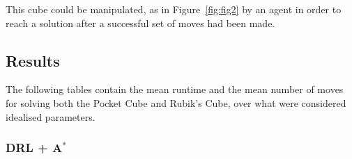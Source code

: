 \documentclass[UKenglish]{libraries/svproc}
\begin{document}
This cube could be manipulated, as in Figure~\ref{fig:fig2} by an agent in order to reach a solution after a successful set of moves had been made.

\subsection{Results}

The following tables contain the mean runtime and the mean number of moves for solving both the Pocket Cube and Rubik's Cube, over what were considered idealised parameters.

\vspace{8pt}
{\centering
{}

\vspace{8pt}
}

\vspace{8pt}
{\centering
{}

\vspace{8pt}
}



\subsubsection{DRL + A$^{\ast}$}
\end{document}
